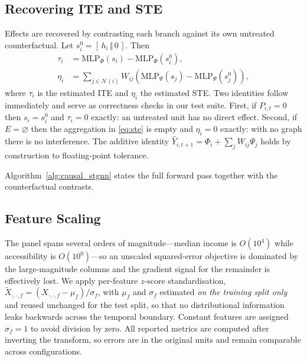 \subsection{Recovering ITE and STE}

Effects are recovered by contrasting each branch against its own untreated
counterfactual. Let $s_i^{0} = [\, h_i \,\Vert\, 0 \,]$. Then
\begin{align}
  \tau_i &= \mathrm{MLP}_{\Phi}(s_i) - \mathrm{MLP}_{\Phi}(s_i^{0}),
  \label{eq:ite}\\
  \eta_i &= \sum_{j \in \mathcal{N}(i)} W_{ij}
            \left( \mathrm{MLP}_{\Psi}(s_j) - \mathrm{MLP}_{\Psi}(s_j^{0}) \right),
  \label{eq:ste}
\end{align}
where $\tau_i$ is the estimated ITE and $\eta_i$ the estimated STE. Two
identities follow immediately and serve as correctness checks in our test
suite. First, if $P_{i,t} = 0$ then $s_i = s_i^{0}$ and $\tau_i = 0$ exactly:
an untreated unit has no direct effect. Second, if $E = \varnothing$ then the
aggregation in \eqref{eq:ste} is empty and $\eta_i = 0$ exactly: with no graph
there is no interference. The additive identity
$\hat{Y}_{i,t+1} = \Phi_i + \sum_j W_{ij}\Psi_j$ holds by construction to
floating-point tolerance.

Algorithm~\ref{alg:causal_stgnn} states the full forward pass together with the
counterfactual contrasts.



\subsection{Feature Scaling}
\label{subsec:scaling}

The panel spans several orders of magnitude---median income is $O(10^{4})$
while accessibility is $O(10^{0})$---so an unscaled squared-error objective is
dominated by the large-magnitude columns and the gradient signal for the
remainder is effectively lost. We apply per-feature $z$-score standardisation,
$\tilde{X}_{\cdot,\cdot,f} = (X_{\cdot,\cdot,f} - \mu_f)/\sigma_f$, with
$\mu_f$ and $\sigma_f$ estimated \emph{on the training split only} and reused
unchanged for the test split, so that no distributional information leaks
backwards across the temporal boundary. Constant features are assigned
$\sigma_f = 1$ to avoid division by zero. All reported metrics are computed
after inverting the transform, so errors are in the original units and remain
comparable across configurations.

